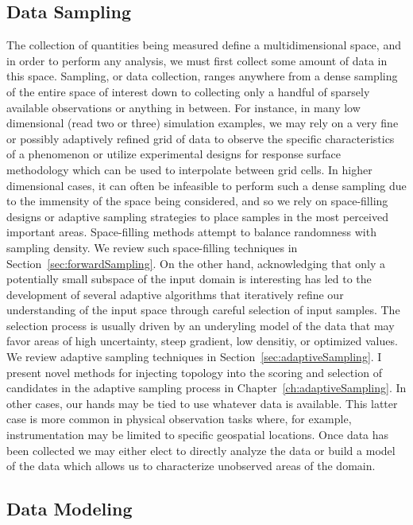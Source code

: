 \subsection{Data Sampling}

The collection of quantities being measured define a multidimensional space, and in order to perform any analysis, we must first collect some amount of data in this space.
%
Sampling, or data collection, ranges anywhere from a dense sampling of the entire space of interest down to collecting only a handful of sparsely available observations or anything in between.
%
For instance, in many low dimensional (read two or three) simulation examples, we may rely on a very fine or possibly adaptively refined grid of data to observe the specific characteristics of a phenomenon or utilize experimental designs for response surface methodology which can be used to interpolate between grid cells.
%
In higher dimensional cases, it can often be infeasible to perform such a dense sampling due to the immensity of the space being considered, and so we rely on space-filling designs or adaptive sampling strategies to place samples in the most perceived important areas.
%
Space-filling methods attempt to balance randomness with sampling density.
%
We review such space-filling techniques in Section~\ref{sec:forwardSampling}.
%
On the other hand, acknowledging that only a potentially small subspace of the input domain is interesting has led to the development of several adaptive algorithms that iteratively refine our understanding of the input space through careful selection of input samples.
%
The selection process is usually driven by an underyling model of the data that may favor areas of high uncertainty, steep gradient, low densitiy, or optimized values.
%
We review adaptive sampling techniques in Section~\ref{sec:adaptiveSampling}.
%
I present novel methods for injecting topology into the scoring and selection of candidates in the adaptive sampling process in Chapter~\ref{ch:adaptiveSampling}.
%
In other cases, our hands may be tied to use whatever data is available.
%
This latter case is more common in physical observation tasks where, for example, instrumentation may be limited to specific geospatial locations.
%
Once data has been collected we may either elect to directly analyze the data or build a model of the data which allows us to characterize unobserved areas of the domain.

\subsection{Data Modeling}

